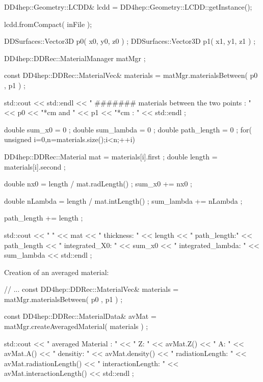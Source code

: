 \documentclass[10pt,a4paper]{article}
\begin{document}
\begin{code}

  DD4hep::Geometry::LCDD& lcdd = DD4hep::Geometry::LCDD::getInstance();

  lcdd.fromCompact( inFile );

  DDSurfaces::Vector3D p0( x0, y0, z0 ) ;
  DDSurfaces::Vector3D p1( x1, y1, z1 ) ;

  DD4hep::DDRec::MaterialManager matMgr ;

  const DD4hep::DDRec::MaterialVec& materials = matMgr.materialsBetween( p0 , p1  ) ;
	
  std::cout  << std::endl  
             << " #######  materials between the two  points : " 
             << p0 << "*cm  and " << p1 << "*cm :  "  
             << std::endl ;

  double sum_x0 = 0 ;
  double sum_lambda = 0 ;
  double path_length = 0 ;
  for( unsigned i=0,n=materials.size();i<n;++i){

    DD4hep::DDRec::Material mat =  materials[i].first  ;
    double length = materials[i].second  ;

    double nx0 = length / mat.radLength()  ;
    sum_x0 += nx0 ;

    double nLambda = length / mat.intLength()  ;
    sum_lambda += nLambda ;

    path_length += length ;

    std::cout << "      "               << mat 
              << " thickness: "         << length 
              << " path_length:"        << path_length
              << " integrated_X0: "     << sum_x0 
              << " integrated_lambda: " << sum_lambda 
              <<  std::endl ;
  }

\end{code}

\noindent
Creation of an averaged material:

\begin{code}
  // ...
  const DD4hep::DDRec::MaterialVec& materials = matMgr.materialsBetween( p0 , p1  ) ;
	
  const DD4hep::DDRec::MaterialData& avMat = matMgr.createAveragedMaterial( materials ) ;

  std::cout << " averaged Material : " << " Z: " << avMat.Z() << " A: " << avMat.A() 
            << " densitiy: "           << avMat.density()
            << " radiationLength: "    << avMat.radiationLength() 
            << " interactionLength: "  << avMat.interactionLength()  
            << std::endl ;
\end{code}
\end{document}
